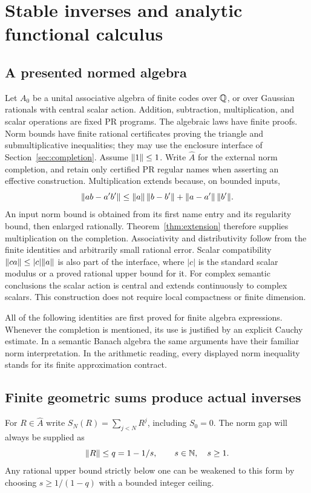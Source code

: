 \section{Stable inverses and analytic functional calculus}\label{sec:analytic-algebras}

\subsection{A presented normed algebra}

Let $A_0$ be a unital associative algebra of finite codes over $\mathbb Q$, or over Gaussian rationals with central scalar action. Addition, subtraction, multiplication, and scalar operations are fixed PR programs. The algebraic laws have finite proofs. Norm bounds have finite rational certificates proving the triangle and submultiplicative inequalities; they may use the enclosure interface of Section~\ref{sec:completion}. Assume $\lVert 1\rVert\le1$. Write $\widehat A$ for the external norm completion, and retain only certified PR regular names when asserting an effective construction. Multiplication extends because, on bounded inputs,
\[
 \lVert ab-a'b'\rVert\le\lVert a\rVert\,\lVert b-b'\rVert+\lVert a-a'\rVert\,\lVert b'\rVert.
\]
An input norm bound is obtained from its first name entry and its regularity bound, then enlarged rationally. Theorem~\ref{thm:extension} therefore supplies multiplication on the completion. Associativity and distributivity follow from the finite identities and arbitrarily small rational error. Scalar compatibility $\lVert ca\rVert\le |c|\lVert a\rVert$ is also part of the interface, where $|c|$ is the standard scalar modulus or a proved rational upper bound for it. For complex semantic conclusions the scalar action is central and extends continuously to complex scalars. This construction does not require local compactness or finite dimension.

All of the following identities are first proved for finite algebra expressions. Whenever the completion is mentioned, its use is justified by an explicit Cauchy estimate. In a semantic Banach algebra the same arguments have their familiar norm interpretation. In the arithmetic reading, every displayed norm inequality stands for its finite approximation contract.

\subsection{Finite geometric sums produce actual inverses}

For $R\in\widehat A$ write $S_N(R)=\sum_{j<N}R^j$, including $S_0=0$. The norm gap will always be supplied as
\begin{equation}\label{eq:neumann-gap}
 \lVert R\rVert\le q=1-1/s,\qquad s\in\mathbb N,\quad s\ge1.
\end{equation}
Any rational upper bound strictly below one can be weakened to this form by choosing $s\ge1/(1-q)$ with a bounded integer ceiling.

